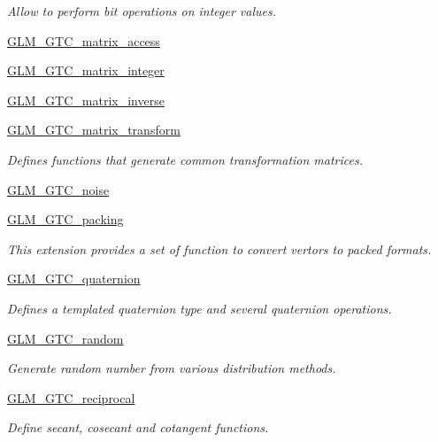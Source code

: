 \begin{DoxyCompactItemize}
\begin{DoxyCompactList}\small\item\em Allow to perform bit operations on integer values. \end{DoxyCompactList}\item 
\mbox{\hyperlink{group__gtc__matrix__access}{G\+L\+M\+\_\+\+G\+T\+C\+\_\+matrix\+\_\+access}}
\item 
\mbox{\hyperlink{group__gtc__matrix__integer}{G\+L\+M\+\_\+\+G\+T\+C\+\_\+matrix\+\_\+integer}}
\item 
\mbox{\hyperlink{group__gtc__matrix__inverse}{G\+L\+M\+\_\+\+G\+T\+C\+\_\+matrix\+\_\+inverse}}
\item 
\mbox{\hyperlink{group__gtc__matrix__transform}{G\+L\+M\+\_\+\+G\+T\+C\+\_\+matrix\+\_\+transform}}
\begin{DoxyCompactList}\small\item\em Defines functions that generate common transformation matrices. \end{DoxyCompactList}\item 
\mbox{\hyperlink{group__gtc__noise}{G\+L\+M\+\_\+\+G\+T\+C\+\_\+noise}}
\item 
\mbox{\hyperlink{group__gtc__packing}{G\+L\+M\+\_\+\+G\+T\+C\+\_\+packing}}
\begin{DoxyCompactList}\small\item\em This extension provides a set of function to convert vertors to packed formats. \end{DoxyCompactList}\item 
\mbox{\hyperlink{group__gtc__quaternion}{G\+L\+M\+\_\+\+G\+T\+C\+\_\+quaternion}}
\begin{DoxyCompactList}\small\item\em Defines a templated quaternion type and several quaternion operations. \end{DoxyCompactList}\item 
\mbox{\hyperlink{group__gtc__random}{G\+L\+M\+\_\+\+G\+T\+C\+\_\+random}}
\begin{DoxyCompactList}\small\item\em Generate random number from various distribution methods. \end{DoxyCompactList}\item 
\mbox{\hyperlink{group__gtc__reciprocal}{G\+L\+M\+\_\+\+G\+T\+C\+\_\+reciprocal}}
\begin{DoxyCompactList}\small\item\em Define secant, cosecant and cotangent functions. \end{DoxyCompactList}\item 

\end{DoxyCompactItemize}
